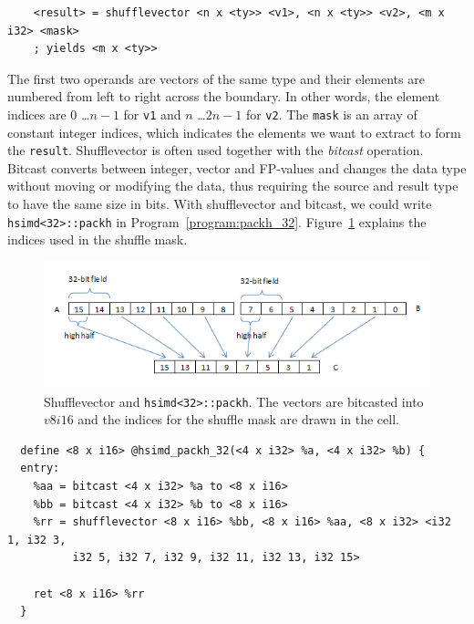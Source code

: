 \begin{verbatim}
    <result> = shufflevector <n x <ty>> <v1>, <n x <ty>> <v2>, <m x i32> <mask>
    ; yields <m x <ty>>
\end{verbatim}

The first two operands are vectors of the same type and their elements are numbered from left to right across the boundary. In other words, the element indices are $0$ \ldots $n-1$ for {\tt v1} and $n$ \ldots $2n-1$ for {\tt v2}. The {\tt mask} is an array of constant integer indices, which indicates the elements we want to extract to form the {\tt result}. Shufflevector is often used together with the \textit{bitcast} operation. Bitcast converts between integer, vector and FP-values and changes the data type without moving or modifying the data, thus requiring the source and result type to have the same size in bits. With shufflevector and bitcast, we could write {\tt hsimd<32>::packh} in Program~\ref{program:packh_32}. Figure~\ref{figure:packh_32} explains the indices used in the shuffle mask.

\begin{figure}[ht!]
\centering
\includegraphics[width=130mm]{draw/packh_16.png}
\caption[Implement {\tt hsimd<32>::packh} with shufflevector]{Shufflevector and {\tt hsimd<32>::packh}. The vectors are bitcasted into $v8i16$ and the indices for the shuffle mask are drawn in the cell.}
\label{figure:packh_32}
\end{figure}

\begin{program}
\begin{verbatim}
  define <8 x i16> @hsimd_packh_32(<4 x i32> %a, <4 x i32> %b) {
  entry:
    %aa = bitcast <4 x i32> %a to <8 x i16>
    %bb = bitcast <4 x i32> %b to <8 x i16>
    %rr = shufflevector <8 x i16> %bb, <8 x i16> %aa, <8 x i32> <i32 1, i32 3,
          i32 5, i32 7, i32 9, i32 11, i32 13, i32 15>

    ret <8 x i16> %rr
  }
\end{verbatim}
\caption[Shufflevector implementation of packh.]{Shufflevector and {\tt hsimd<32>::packh} in LLVM IR\@. Horizontal operations half the width of fields and that effect is reflected in the return value type.}
\label{program:packh_32}
\end{program}

